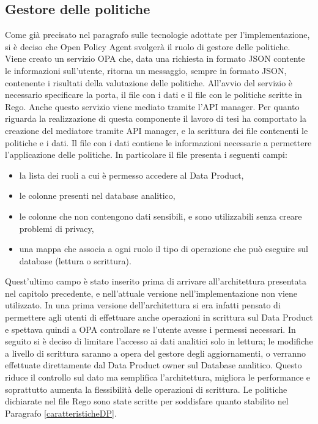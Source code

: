 \documentclass[12pt]{report}
\begin{document}
\subsection{Gestore delle politiche}
Come già precisato nel paragrafo sulle tecnologie adottate per l'implementazione,  si è deciso che Open Policy Agent svolgerà il ruolo di gestore delle politiche.
Viene creato un servizio OPA che, data una richiesta in formato JSON contente le informazioni sull'utente, ritorna un messaggio, sempre in formato JSON, contenente i risultati della valutazione delle politiche.
All'avvio del servizio è necessario specificare la porta, il file con i dati e il file con le politiche scritte in Rego.
Anche questo servizio viene mediato tramite l'API manager.
Per quanto riguarda la realizzazione di  questa componente il lavoro di tesi ha comportato la creazione del mediatore tramite API manager, e la scrittura dei file contenenti le politiche e i dati.
Il file con i dati contiene le informazioni necessarie a permettere l'applicazione delle politiche.
In particolare il file presenta i seguenti campi:
\begin{itemize}
    \item la lista dei ruoli a cui è permesso accedere al Data Product,
    \item le colonne presenti nel database analitico,
    \item le colonne che non contengono dati sensibili, e sono utilizzabili senza creare problemi di privacy,
    \item una mappa che associa a ogni ruolo il tipo di operazione che può eseguire sul database (lettura o scrittura).
\end{itemize}
Quest'ultimo campo è stato inserito prima di arrivare all'architettura presentata nel capitolo precedente, e nell'attuale versione nell'implementazione non viene utilizzato.
In una prima versione dell'architettura si era infatti pensato di permettere agli utenti di effettuare anche operazioni in scrittura sul Data Product e spettava quindi a OPA controllare se l'utente avesse i permessi necessari.
In seguito si è deciso di limitare l'accesso ai dati analitici solo in lettura; le modifiche a livello di scrittura saranno a opera del gestore degli aggiornamenti, o verranno effettuate direttamente dal Data Product owner sul Database analitico.
Questo riduce il controllo sul dato ma semplifica l'architettura, migliora le performance e soprattutto aumenta la flessibilità delle operazioni di scrittura.
Le politiche dichiarate nel file Rego sono state scritte per soddisfare quanto stabilito nel Paragrafo \ref{caratteristicheDP}.
\end{document}
